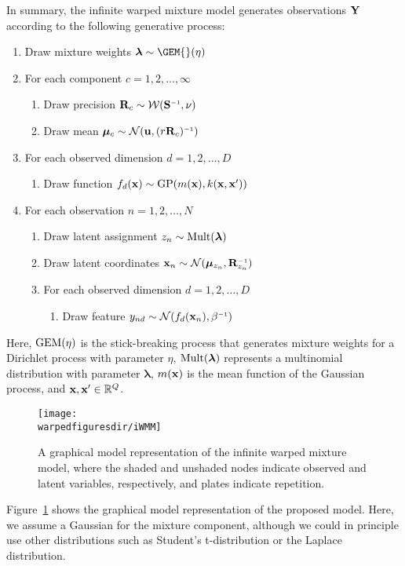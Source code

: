 In summary, the infinite warped mixture model generates observations $\mathbf{Y}$ according to the following generative process:
%
\begin{enumerate}
\item Draw mixture weights $\bm{\lambda} \sim {\rm \GEM{}}(\eta)$
\item For each component $c=1, 2, \dots, \infty$
\begin{enumerate}
\item Draw precision $\vR_c \sim {\mathcal W}(\vS\inv, \nu)$
\item Draw mean $\vmu_c \sim {\mathcal N}(\vu,(r\vR_c)\inv)$
\end{enumerate}
\item For each observed dimension $d=1, 2, \dots, D$
\begin{enumerate}
\item Draw function $f_{d}({\bf{x}}) \sim {\rm GP}(m({\bf{x}}),k({\bf{x}},{\bf{x}}'))$
\end{enumerate}
\item For each observation $n=1, 2, \dots,N$
\begin{enumerate}
\item Draw latent assignment $z_n \sim {\rm Mult}(\bm{\lambda})$
\item Draw latent coordinates $\vx_n \sim {\mathcal N}(\vmu_{z_n},\vR_{z_n}\inv)$
\item For each observed dimension $d=1, 2, \dots, D$
\begin{enumerate}
\item Draw feature $y_{nd} \sim {\cal N}(f_d(\vx_n), \beta\inv)$
\end{enumerate}
\end{enumerate}
\end{enumerate}
%
Here, ${\rm GEM}(\eta)$ is the stick-breaking process \citep{sethuraman94} that generates mixture weights for a Dirichlet process with parameter $\eta$, %
${\rm Mult}(\bm{\lambda})$ represents a multinomial distribution with parameter $\bm{\lambda}$,
$m({\bf{x}})$ is the mean function of the Gaussian process, and ${\bf{x}},{\bf{x}}'\in{\mathbb R}^{Q}$.
%
\begin{figure}[t!]
\centering
\texttt{[image: \\warpedfiguresdir/iWMM]}
\caption[Graphical model of the infinite warped mixture model]{A graphical model representation of the infinite warped mixture model, where the shaded and unshaded nodes indicate observed and latent variables, respectively, and plates indicate repetition.}
\label{fig:graphical}
\end{figure}
%
Figure~\ref{fig:graphical} shows the graphical model representation of the proposed model.
Here, we assume a Gaussian for the mixture component, although we could in principle use other distributions such as Student's t-distribution or the Laplace distribution.


